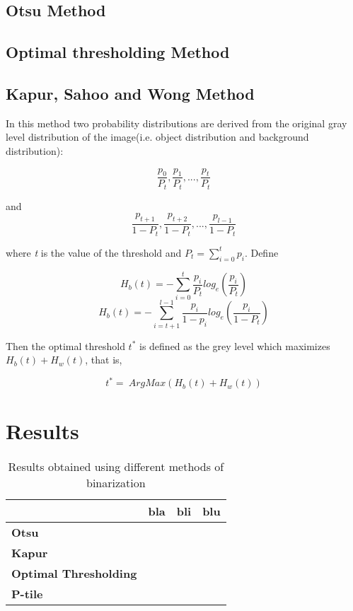 \documentclass[12]{article}
\begin{document}
\subsection{Otsu Method}


\subsection{Optimal thresholding Method}


\subsection{Kapur, Sahoo and Wong Method}
In this method two probability distributions are derived from the original gray level distribution of the image(i.e. object distribution and background distribution): 
\vspace{-0.5cm}
\begin{center}
$$\frac{p_0}{P_t},\frac{p_1}{P_t},...,\frac{p_t}{P_t}$$
\end{center} \begin{center}
and
$$\frac{p_{t+1}}{1-P_t},\frac{p_{t+2}}{1-P_t},...,\frac{p_{l-1}}{1-P_t}$$
\end{center}
\vspace{0.4cm}

where \textit{t} is the value of the threshold and $P_t = \sum_{i=0}^{t}{p_i}$. Define

$$H_b(t) = - \sum_{i = 0}^{t} \frac{p_i}{P_t}log_e\left(\frac{p_i}{P_t}\right)$$
$$ H_b(t) = - \sum_{i = t+1}^{l-1} \frac{p_i}{1-p_i}log_e\left(\frac{p_i}{1-P_t}\right)$$

Then the optimal threshold $t^{*}$ is defined as the grey level which maximizes $H_b(t)+H_w(t)$, that is, 
\vspace{-0.5cm}
\begin{center}
$$t^{*}=\ ArgMax\left(H_b(t) + H_w(t)\right)$$
\end{center}
\section{Results}

\begin{table}[h]
\centering
\begin{tabular}{|l|l|l|l|}
\hline
& bla & bli & blu \\  \hline
\textbf{Otsu} &  &  &  \\ \hline
 \textbf{Kapur} & & &  \\  \hline
 \textbf{Optimal Thresholding} & & &  \\ \hline
  \textbf{P-tile} & & & \\ \hline
\end{tabular}
\caption{Results obtained using different methods of binarization}
\label{Results}
\end{table}
\end{document}
